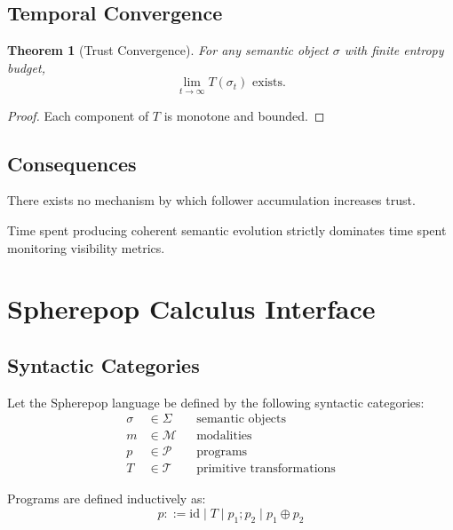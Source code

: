 \documentclass[11pt]{article}
\newtheorem{theorem}{Theorem}
\begin{document}
\subsection{Temporal Convergence}

\begin{theorem}[Trust Convergence]
For any semantic object $\sigma$ with finite entropy budget,
\[
\lim_{t \to \infty} T(\sigma_t) \text{ exists}.
\]
\end{theorem}

\begin{proof}
Each component of $T$ is monotone and bounded.
\end{proof}

\subsection{Consequences}

\begin{corollary}
There exists no mechanism by which follower accumulation increases trust.
\end{corollary}

\begin{corollary}
Time spent producing coherent semantic evolution strictly dominates time spent monitoring
visibility metrics.
\end{corollary}

\section{Spherepop Calculus Interface}

\subsection{Syntactic Categories}

Let the Spherepop language be defined by the following syntactic categories:
\[
\begin{aligned}
\sigma &\in \Sigma && \text{semantic objects} \\
m &\in \mathcal{M} && \text{modalities} \\
p &\in \mathcal{P} && \text{programs} \\
T &\in \mathcal{T} && \text{primitive transformations}
\end{aligned}
\]

Programs are defined inductively as:
\[
p ::= \text{id} \mid T \mid p_1 ; p_2 \mid p_1 \oplus p_2
\]
\end{document}
